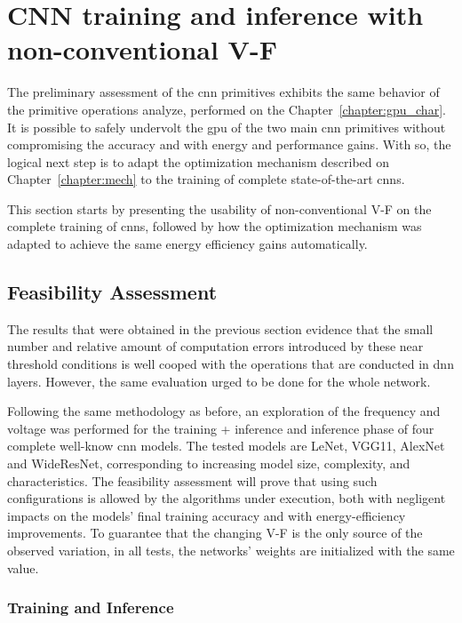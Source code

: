 \section{CNN training and inference with non-conventional V-F}
\label{section:enhanced}

The preliminary assessment of the \acrshort{cnn} primitives exhibits the same behavior of the primitive operations analyze, performed on the Chapter~\ref{chapter:gpu_char}. It is possible to safely undervolt the \acrshort{gpu} of the two main \acrshort{cnn} primitives without compromising the accuracy and with energy and performance gains. With so, the logical next step is to adapt the optimization mechanism described on Chapter~\ref{chapter:mech} to the training of complete state-of-the-art \acrshort{cnn}s.


This section starts by presenting the usability of non-conventional V-F on the complete training of \acrshort{cnn}s, followed by how the optimization mechanism was adapted to achieve the same energy efficiency gains automatically.

\subsection{Feasibility Assessment}

The results that were obtained in the previous section evidence that the small number and relative amount of computation errors introduced by these near threshold conditions is well cooped with the operations that are conducted in \acrshort{dnn} layers. However, the same evaluation urged to be done for the whole network.


Following the same methodology as before, an exploration of the frequency and voltage was performed for the training + inference and inference phase of four complete well-know \acrshort{cnn} models. The tested models are LeNet, VGG11, AlexNet and WideResNet, corresponding to increasing model size, complexity, and characteristics. The feasibility assessment will prove that using such configurations is allowed by the algorithms under execution, both with negligent impacts on the models' final training accuracy and with energy-efficiency improvements. To guarantee that the changing V-F is the only source of the observed variation, in all tests, the networks' weights are initialized with the same value.


\subsubsection{Training and Inference}


